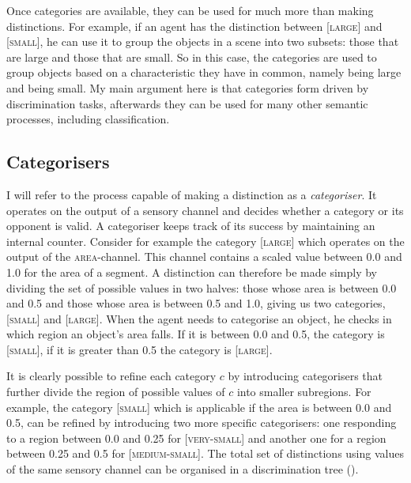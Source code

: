 Once categories are available, they can be 
used for much more than making distinctions. For example, 
if an agent has the distinction between [\textsc{large}] and [\textsc{small}],
he can use it to group the objects in a scene into two
subsets: those that are large and those that are small. 
So in this case, the categories are used to group 
objects based on a characteristic they have in common, 
namely being large and being small. My main argument here is that 
categories form driven by discrimination tasks,
afterwards they can be used for many other 
semantic processes, including classification. 

\subsection{Categorisers}

I will refer to the process capable of making a distinction as
a {\itshape categoriser}. %
It operates on the output of 
a sensory channel and decides whether a category or its opponent
is valid. A categoriser keeps track of its success 
by maintaining an internal counter. 
Consider for example the category [\textsc{large}] which 
operates on the output of the \textsc{area}-channel. This channel 
contains a scaled value 
between 0.0 and 1.0 for the area of a segment. A distinction 
can therefore be 
made simply by dividing the set of possible values in two
halves: those whose area is between
0.0 and 0.5 and those whose area is between 0.5 and
1.0, giving us two categories, [\textsc{small}] and [\textsc{large}]. When 
the agent needs to categorise an object, he checks in which
region an object's area falls. If it is between 0.0 and 0.5, the
category is [\textsc{small}], if it is greater than 0.5 the category
is [\textsc{large}]. 

It is clearly possible to refine each 
category $c$ by introducing categorisers that 
further divide the region of possible values of $c$ into 
smaller subregions. For example, the category [\textsc{small}] which 
is applicable if the area is between 0.0 and 0.5, can be refined 
by introducing two more specific categorisers: one responding
to a region between 0.0 and 
0.25 for [\textsc{very}-\textsc{small}] and another one for a region
between 0.25 and 0.5 for [\textsc{medium}-\textsc{small}]. The total set of
distinctions using values of the same sensory channel
can be organised in a discrimination tree (). 

